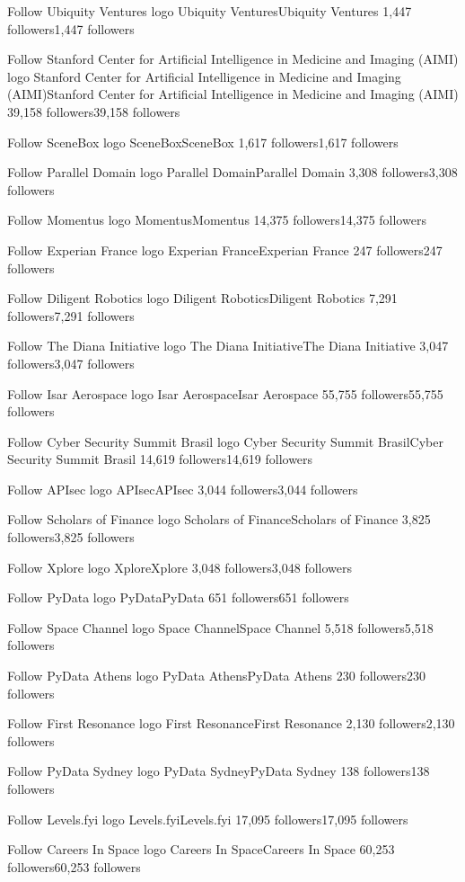 Follow
Ubiquity Ventures logo
Ubiquity VenturesUbiquity Ventures
1,447 followers1,447 followers

Follow
Stanford Center for Artificial Intelligence in Medicine and Imaging (AIMI) logo
Stanford Center for Artificial Intelligence in Medicine and Imaging (AIMI)Stanford Center for Artificial Intelligence in Medicine and Imaging (AIMI)
39,158 followers39,158 followers

Follow
SceneBox logo
SceneBoxSceneBox
1,617 followers1,617 followers

Follow
Parallel Domain logo
Parallel DomainParallel Domain
3,308 followers3,308 followers

Follow
Momentus logo
MomentusMomentus
14,375 followers14,375 followers

Follow
Experian France logo
Experian FranceExperian France
247 followers247 followers

Follow
Diligent Robotics logo
Diligent RoboticsDiligent Robotics
7,291 followers7,291 followers

Follow
The Diana Initiative logo
The Diana InitiativeThe Diana Initiative
3,047 followers3,047 followers

Follow
Isar Aerospace logo
Isar AerospaceIsar Aerospace
55,755 followers55,755 followers

Follow
Cyber Security Summit Brasil logo
Cyber Security Summit BrasilCyber Security Summit Brasil
14,619 followers14,619 followers

Follow
APIsec logo
APIsecAPIsec
3,044 followers3,044 followers

Follow
Scholars of Finance logo
Scholars of FinanceScholars of Finance
3,825 followers3,825 followers

Follow
Xplore logo
XploreXplore
3,048 followers3,048 followers

Follow
PyData logo
PyDataPyData
651 followers651 followers

Follow
Space Channel logo
Space ChannelSpace Channel
5,518 followers5,518 followers

Follow
PyData Athens logo
PyData AthensPyData Athens
230 followers230 followers

Follow
First Resonance logo
First ResonanceFirst Resonance
2,130 followers2,130 followers

Follow
PyData Sydney logo
PyData SydneyPyData Sydney
138 followers138 followers

Follow
Levels.fyi logo
Levels.fyiLevels.fyi
17,095 followers17,095 followers

Follow
Careers In Space logo
Careers In SpaceCareers In Space
60,253 followers60,253 followers

